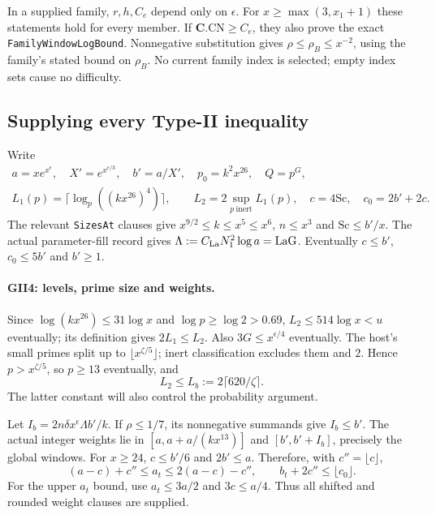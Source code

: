 \documentclass[11pt,a4paper]{article}
\numberwithin{equation}{section}
\theoremstyle{remark}\newtheorem{remark}[theorem]{Remark}
\begin{document}
In a supplied family, $r,h,C_e$ depend only on $\epsilon$. For
$x\ge\max(3,x_1+1)$ these statements hold for every member. If
$\mathbf C.\mathrm{CN}\ge C_e$, they also prove the exact
\texttt{FamilyWindowLogBound}. Nonnegative substitution gives
$\rho\le\rho_B\le x^{-2}$, using the family's stated bound on $\rho_B$.
No current family index is selected; empty index sets cause no difficulty.

\subsection{Supplying every Type-II inequality}

Write
\[
\begin{gathered}
 a=xe^{x^\epsilon},\quad X'=e^{x^{\epsilon/3}},\quad b'=a/X',
 \quad p_0=k^2x^{26},\quad Q=p^G,\\
 L_1(p)=\lceil\log_p((kx^{26})^4)\rceil,\qquad
 L_2=2\sup_{p\ \mathrm{inert}}L_1(p),\quad c=4\mathrm{Sc},\quad c_0=2b'+2c.
\end{gathered}\tag{GII.4}
\]
The relevant \texttt{SizesAt} clauses give
$x^{9/2}\le k\le x^5\le x^6$, $n\le x^3$ and $\mathrm{Sc}\le b'/x$.
The actual parameter-fill record gives
$\Lambda:=C_{\rm La}N_1^2\log a=\mathrm{LaG}$.
Eventually $c\le b'$, $c_0\le5b'$ and $b'\ge1$.

\paragraph{GII4: levels, prime size and weights.}
Since $\log(kx^{26})\le31\log x$ and $\log p\ge\log2>0.69$,
$L_2\le514\log x<u$ eventually; its definition gives $2L_1\le L_2$.
Also $3G\le x^{\epsilon/4}$ eventually. The host's small primes split
up to $\lfloor x^{\zeta/5}\rfloor$; inert classification excludes them
and $2$. Hence $p>x^{\zeta/5}$, so $p\ge13$ eventually, and
\[
 L_2\le L_b:=2\lceil620/\zeta\rceil.\tag{GII.5}
\]
The latter constant will also control the probability argument.

Let $I_b=2n\delta x^\epsilon\Lambda b'/k$. If $\rho\le1/7$, its
nonnegative summands give $I_b\le b'$. The actual integer weights lie in
$[a,a+a/(kx^{13})]$ and $[b',b'+I_b]$, precisely the global windows.
For $x\ge24$, $c\le b'/6$ and $2b'\le a$. Therefore, with
$c''=\lfloor c\rfloor$,
\[
 (a-c)+c''\le a_t\le2(a-c)-c'',\qquad
 b_t+2c''\le\lfloor c_0\rfloor.\tag{GII.6}
\]
For the upper $a_t$ bound, use $a_t\le3a/2$ and $3c\le a/4$.
Thus all shifted and rounded weight clauses are supplied.
\end{document}
